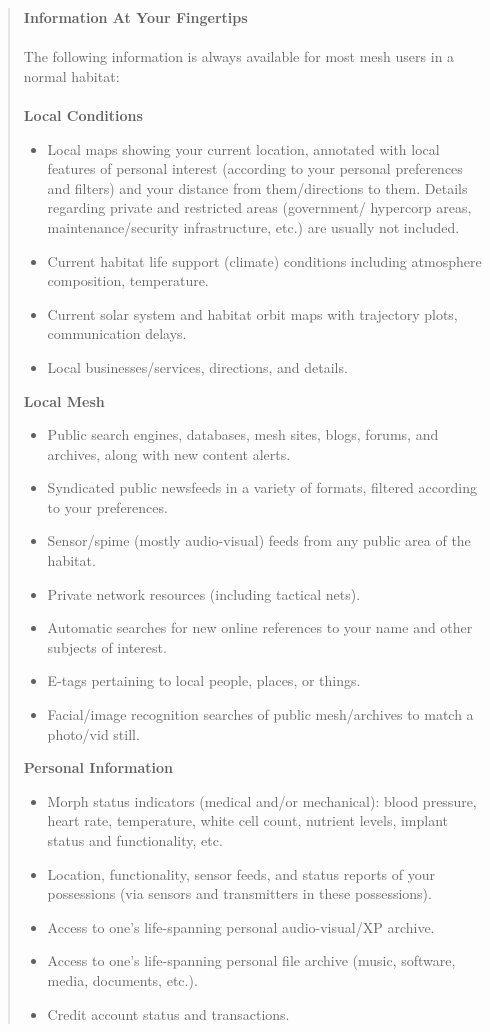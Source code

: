 \begin{quotation}
\textbf{Information At Your Fingertips}
\\
\\
The following information is always available for most mesh users in a normal habitat:
\\
\\
\noindent \textbf{Local Conditions}
\begin{itemize}
\item Local maps showing your current location, annotated with local features of personal interest (according to your personal preferences and filters) and your distance from them/directions to them. Details regarding private and restricted areas (government/ hypercorp areas, maintenance/security infrastructure, etc.) are usually not included.
\item Current habitat life support (climate) conditions including atmosphere composition, temperature.
\item Current solar system and habitat orbit maps with trajectory plots, communication delays.
\item Local businesses/services, directions, and details.
\end{itemize}

\noindent \textbf{Local Mesh}
\begin{itemize}
\item Public search engines, databases, mesh sites, blogs, forums, and archives, along with new content alerts.
\item Syndicated public newsfeeds in a variety of formats, filtered according to your preferences.
\item Sensor/spime (mostly audio-visual) feeds from any public area of the habitat.
\item Private network resources (including tactical nets).
\item Automatic searches for new online references to your name and other subjects of interest.
\item E-tags pertaining to local people, places, or things.
\item Facial/image recognition searches of public mesh/archives to match a photo/vid still.
\end{itemize}

\noindent \textbf{Personal Information}
\begin{itemize}
\item Morph status indicators (medical and/or mechanical): blood pressure, heart rate, temperature, white cell count, nutrient levels, implant status and functionality, etc.
\item Location, functionality, sensor feeds, and status reports of your possessions (via sensors and transmitters in these possessions).
\item Access to one’s life-spanning personal audio-visual/XP archive.
\item Access to one’s life-spanning personal file archive (music, software, media, documents, etc.).
\item Credit account status and transactions.
\end{itemize}


\end{quotation}
